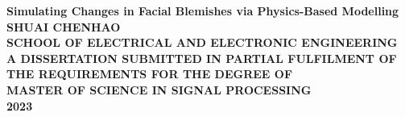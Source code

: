 \begin{titlepage}
\begin{center}
\vspace*{2in}
\Huge{\textbf{Simulating Changes in Facial Blemishes via Physics-Based Modelling}}\\[2.2in]

\LARGE{\textbf{\MakeUppercase{Shuai Chenhao}}}\\[1in]

\normalsize{\textbf{\MakeUppercase{SCHOOL OF ELECTRICAL AND ELECTRONIC ENGINEERING}}}\\[0.5in]
\normalsize{\textbf{\MakeUppercase{A DISSERTATION SUBMITTED IN PARTIAL FULFILMENT OF\\THE REQUIREMENTS FOR THE DEGREE OF\\MASTER OF SCIENCE IN SIGNAL PROCESSING}}}\\[0.75in]
\large{\textbf{2023}}
\end{center}
\end{titlepage}
\newpage